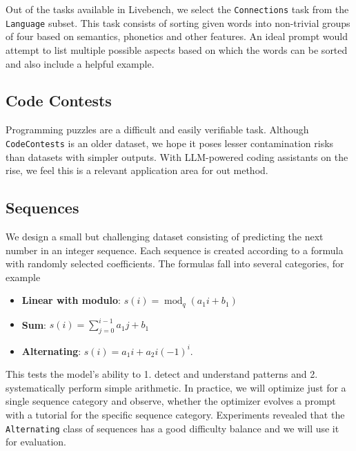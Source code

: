 Out of the tasks available in Livebench, we select the \texttt{Connections} task from the \texttt{Language} subset. 
This task consists of sorting given words into non-trivial groups of four based on semantics, phonetics and other features. 
An ideal prompt would attempt to list multiple possible aspects based on which the words can be sorted and also include a helpful example.

\subsection{Code Contests}
Programming puzzles are a difficult and easily verifiable task. Although \texttt{CodeContests}\cite{li2022competition} is an older dataset, 
we hope it poses lesser contamination risks than datasets with simpler outputs. With LLM-powered coding assistants on the rise, we
feel this is a relevant application area for out method. 

\subsection{Sequences}
We design a small but challenging dataset consisting of predicting the next number in an integer sequence.
Each sequence is created according to a formula with randomly selected coefficients. The formulas fall into several categories, for example
\begin{itemize}
    \item \textbf{Linear with modulo}: $s(i) = \operatorname{mod}_{q}(a_{1} i + b_{1})$
    \item \textbf{Sum}: $s(i) = \sum_{j=0}^{i-1}a_{1} j + b_{1}$
    \item \textbf{Alternating}: $s(i) = a_{1}i + a_{2}i(-1)^{i}$.
\end{itemize}
This tests the model's ability to 1. detect and understand patterns and 2. systematically perform simple arithmetic. 
In practice, we will optimize just for a single sequence category and observe, whether the optimizer evolves a prompt with a tutorial for the specific sequence category.
Experiments revealed that the \texttt{Alternating} class of sequences has a good difficulty balance and we will use it for evaluation.
